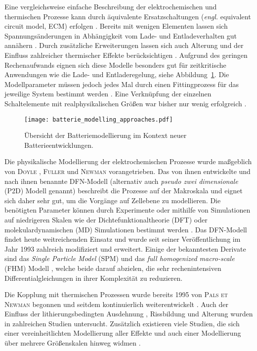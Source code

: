 Eine vergleichsweise einfache Beschreibung der elektrochemischen und thermischen Prozesse kann durch äquivalente Ersatzschaltungen (\textit{engl.} equivalent circuit model, ECM) erfolgen \cite{Bavsic2022}. Bereits mit wenigen Elementen lassen sich Spannungsänderungen in Abhängigkeit vom Lade- und Entladeverhalten gut annähern \cite{YannLiaw2004}. Durch zusätzliche Erweiterungen lassen sich auch Alterung und der Einfluss zahlreicher thermischer Effekte berücksichtigen \cite{Hannan2017,Tran2021}. Aufgrund des geringen Rechenaufwands eignen sich diese Modelle besonders gut für zeitkritische Anwendungen wie die Lade- und Entladeregelung, siehe Abbildung~\ref{fig:battery_modelling_in_context}. Die Modellparameter müssen jedoch jedes Mal durch einen Fittingprozess für das jeweilige System bestimmt werden \cite{Tomasov2019}. Eine Verknüpfung der einzelnen Schaltelemente mit realphysikalischen Größen war bisher nur wenig erfolgreich \cite{Plett2015}.
\begin{figure}[ht]
        \center
	\texttt{[image: batterie\_modelling\_approaches.pdf]}
		\caption{\label{fig:battery_modelling_in_context}Übersicht der Batteriemodellierung im Kontext neuer Batterieentwicklungen.}
\end{figure}
Die physikalische Modellierung der elektrochemischen Prozesse wurde maßgeblich von \textsc{Doyle} \cite{Doyle1995,Doyle2003,Ceder2002}, \textsc{Fuller} \cite{Fuller2018,Takeuchi2008} und \textsc{Newman} \cite{Doyle1995,Newman2021} vorangetrieben. Das von ihnen entwickelte und nach ihnen benannte DFN-Modell (alternativ auch \textit{pseudo zwei dimensionale} (P2D) Modell genannt) \cite{Doyle1993} beschreibt die Prozesse auf der Makroskala und eignet sich daher sehr gut, um die Vorgänge auf Zellebene zu modellieren. Die benötigten Parameter können durch Experimente oder mithilfe von Simulationen auf niedrigeren Skalen wie der Dichtefunktionaltheorie (DFT) oder molekulardynamischen (MD) Simulationen bestimmt werden \cite{Chen2022}. Das DFN-Modell findet heute weitreichenden Einsatz und wurde seit seiner Veröffentlichung im Jahr 1993 zahlreich modifiziert und erweitert. Einige der bekanntesten Derivate sind das \textit{Single Particle Model} (SPM) \cite{Li2017} und das \textit{full homogenized macro-scale} (FHM) Modell \cite{Arunachalam2019}, welche beide darauf abzielen, die sehr rechenintensiven Differentialgleichungen in ihrer Komplexität zu reduzieren.

Die Kopplung mit thermischen Prozessen wurde bereits 1995 von \textsc{Pals et Newman} \cite{Pals1995,Pals1995a} begonnen und seitdem kontinuierlich weiterentwickelt \cite{Chen2005,Onda2006,Kim2013,Gao2021,Liu2023}. Auch der Einfluss der lithierungsbedingten Ausdehnung \cite{Bower2011,Yang2014,Roberts2014,Pereira2019,Mai2019,Li2020,Hoeschele2023}, Rissbildung \cite{Dionisi2017,Wang2020a,Pistorio2023} und Alterung \cite{RedondoIglesias2020} wurden in zahlreichen Studien untersucht. Zusätzlich existieren viele Studien, die sich einer vereinheitlichten Modellierung aller Effekte \cite{Wu2014,Kim2018,Liu2020,Yin2020} und auch einer Modellierung über mehrere Größenskalen hinweg widmen \cite{Liu2019,Li2020a,Katrasnik2021}.

